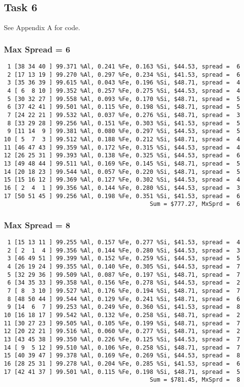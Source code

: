 \documentclass{article}
\begin{document}
\subsection{Task 6}
See Appendix A for code.
\subsubsection{Max Spread = 6}
\begin{verbatim}
 1 [38 34 40 ] 99.371 %Al, 0.241 %Fe, 0.163 %Si, $44.53, spread =  6
 2 [17 13 19 ] 99.270 %Al, 0.297 %Fe, 0.234 %Si, $41.53, spread =  6
 3 [35 36 39 ] 99.615 %Al, 0.043 %Fe, 0.196 %Si, $48.71, spread =  4
 4 [ 6  8 10 ] 99.352 %Al, 0.257 %Fe, 0.275 %Si, $44.53, spread =  4
 5 [30 32 27 ] 99.558 %Al, 0.093 %Fe, 0.170 %Si, $48.71, spread =  5
 6 [37 42 41 ] 99.501 %Al, 0.115 %Fe, 0.198 %Si, $48.71, spread =  5
 7 [24 22 21 ] 99.532 %Al, 0.037 %Fe, 0.276 %Si, $48.71, spread =  3
 8 [33 29 28 ] 99.256 %Al, 0.151 %Fe, 0.303 %Si, $41.53, spread =  5
 9 [11 14  9 ] 99.381 %Al, 0.080 %Fe, 0.297 %Si, $44.53, spread =  5
10 [ 5  7  3 ] 99.512 %Al, 0.188 %Fe, 0.212 %Si, $48.71, spread =  4
11 [46 47 43 ] 99.359 %Al, 0.172 %Fe, 0.315 %Si, $44.53, spread =  4
12 [26 25 31 ] 99.393 %Al, 0.138 %Fe, 0.325 %Si, $44.53, spread =  6
13 [49 48 44 ] 99.511 %Al, 0.169 %Fe, 0.145 %Si, $48.71, spread =  5
14 [20 18 23 ] 99.544 %Al, 0.057 %Fe, 0.220 %Si, $48.71, spread =  5
15 [15 16 12 ] 99.369 %Al, 0.127 %Fe, 0.302 %Si, $44.53, spread =  4
16 [ 2  4  1 ] 99.356 %Al, 0.144 %Fe, 0.280 %Si, $44.53, spread =  3
17 [50 51 45 ] 99.256 %Al, 0.198 %Fe, 0.351 %Si, $41.53, spread =  6
                                          Sum = $777.27, MxSprd =  6
\end{verbatim}

\subsubsection{Max Spread = 8}
\begin{verbatim}
 1 [15 13 11 ] 99.255 %Al, 0.157 %Fe, 0.277 %Si, $41.53, spread =  4
 2 [ 2  1  4 ] 99.356 %Al, 0.144 %Fe, 0.280 %Si, $44.53, spread =  3
 3 [46 49 51 ] 99.399 %Al, 0.152 %Fe, 0.259 %Si, $44.53, spread =  5
 4 [26 19 24 ] 99.355 %Al, 0.140 %Fe, 0.305 %Si, $44.53, spread =  7
 5 [32 29 36 ] 99.509 %Al, 0.087 %Fe, 0.197 %Si, $48.71, spread =  7
 6 [34 35 33 ] 99.358 %Al, 0.156 %Fe, 0.278 %Si, $44.53, spread =  2
 7 [ 8  3 10 ] 99.527 %Al, 0.176 %Fe, 0.194 %Si, $48.71, spread =  7
 8 [48 50 44 ] 99.544 %Al, 0.129 %Fe, 0.241 %Si, $48.71, spread =  6
 9 [14  6  7 ] 99.253 %Al, 0.249 %Fe, 0.360 %Si, $41.53, spread =  8
10 [16 18 17 ] 99.542 %Al, 0.132 %Fe, 0.258 %Si, $48.71, spread =  2
11 [30 27 23 ] 99.505 %Al, 0.105 %Fe, 0.199 %Si, $48.71, spread =  7
12 [20 22 21 ] 99.516 %Al, 0.060 %Fe, 0.277 %Si, $48.71, spread =  2
13 [43 45 38 ] 99.350 %Al, 0.226 %Fe, 0.125 %Si, $44.53, spread =  7
14 [ 9  5 12 ] 99.510 %Al, 0.106 %Fe, 0.258 %Si, $48.71, spread =  7
15 [40 39 47 ] 99.378 %Al, 0.169 %Fe, 0.269 %Si, $44.53, spread =  8
16 [28 25 31 ] 99.278 %Al, 0.204 %Fe, 0.285 %Si, $41.53, spread =  6
17 [42 41 37 ] 99.501 %Al, 0.115 %Fe, 0.198 %Si, $48.71, spread =  5
                                          Sum = $781.45, MxSprd =  8
\end{verbatim}
\end{document}
